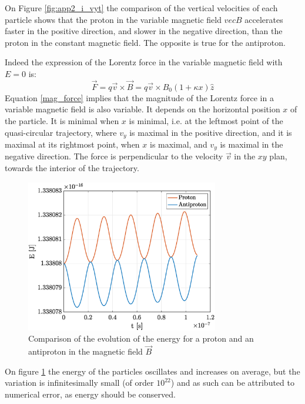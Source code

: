 \documentclass[a4paper,12pt,twoside]{article}
\begin{document}
On Figure \ref{fig:app2_i_vyt} the comparison of the vertical velocities of each particle shows that the proton in the variable magnetic field $vec{B}$ accelerates faster in the positive direction, and slower in the negative direction, than the proton in the constant magnetic field. The opposite is true for the antiproton.

Indeed the expression of the Lorentz force in the variable magnetic field with $E=0$ is:
\begin{equation}
	\vec{F} = q\vec{v} \times \vec{B} = q\vec{v} \times B_0(1+\kappa x)\hat{z}
	\label{mag_force}
\end{equation}
Equation \ref{mag_force} implies that the magnitude of the Lorentz force in a variable magnetic field is also variable. It depends on the horizontal position $x$ of the particle. It is minimal when $x$ is minimal, i.e. at the leftmost point of the quasi-circular trajectory, where $v_y$ is maximal in the positive direction, and it is maximal at its rightmost point, when $x$ is maximal, and $v_y$ is maximal in the negative direction. The force is perpendicular to the velocity $\vec{v}$ in the $xy$ plan, towards the interior of the trajectory.

\begin{figure}[h]
\centering
	\includegraphics[width=0.75\textwidth]{graphs/app2_i_ene.eps}	
	\caption{Comparison of the evolution of the energy for a proton and an antiproton in the magnetic field $\vec{B}$}
	\label{fig:app2_i_ene}
\end{figure}

On figure \ref{fig:app2_i_ene} the energy of the particles oscillates and increases on average, but the variation is infinitesimally small (of order $10^{22}$) and as such can be attributed to numerical error, as energy should be conserved.
\end{document}

